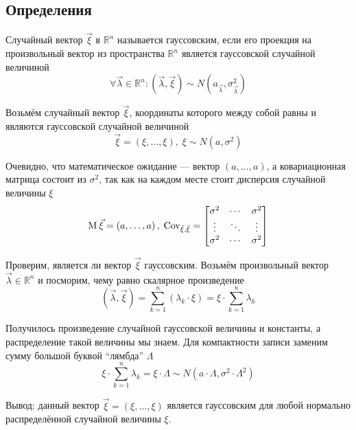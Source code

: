 \subsection{Определения}
\begin{definition}
    \label{def:gaussianVector}
    Случайный вектор $\vec{\xi}$ в $\mathbb{R}^n$ называется гауссовским, если
    его проекция на произвольный вектор из пространства $\mathbb{R}^n$
    является гауссовской случайной величиной
    $$\forall \vec{\lambda} \in \mathbb{R}^n:
        \left( \vec{\lambda}, \vec{\xi} \right)
            \sim N\left( a_{\vec{\lambda}}, \sigma_{\vec{\lambda}}^2 \right)$$
\end{definition}

\begin{example}\label{ex:gaussVectorsIntro}
    Возьмём случайный вектор $\vec{\xi}$, координаты которого между собой равны
    и являются гауссовской случайной величиной
    $$\vec{\xi} = \left( \xi, \dots, \xi \right),\;
        \xi \sim N\left( a, \sigma^2 \right)$$

    Очевидно, что математическое ожидание --- вектор
    $\left( a, \dots, a \right)$, а ковариационная матрица состоит из
    $\sigma^2$, так как на каждом месте стоит дисперсия случайной величины $\xi$
    $$\operatorname{M}_{} \vec{\xi} = \left( a, \dots, a \right),\;
        \operatorname{Cov_{\vec{\xi}, \vec{\xi}}} =
        \begin{bmatrix}
            \sigma^2 & \cdots & \sigma^2 \\
            \vdots & \ddots & \vdots \\
            \sigma^2 & \cdots & \sigma^2
        \end{bmatrix}$$

    Проверим, является ли вектор $\vec{\xi}$ гауссовским.
    Возьмём произвольный вектор $\vec{\lambda} \in \mathbb{R}^n$
    и посморим, чему равно скалярное произведение
    $$\left( \vec{\lambda}, \vec{\xi} \right)
        = \sum_{k=1}^{n} \left( \lambda_k \cdot \xi \right)
        = \xi \cdot \sum_{k=1}^{n} \lambda_k$$

    Получилось произведение случайной гауссовской величины и константы,
    а распределение такой величины мы знаем. Для компактности записи
    заменим сумму большой буквой ``лямбда'' $\Lambda$
    $$\xi \cdot \sum_{k=1}^{n} \lambda_k
        = \xi \cdot \Lambda \sim N\left( a \cdot \Lambda,
            \sigma^2 \cdot \Lambda^2 \right)$$

    Вывод: данный вектор $\vec{\xi}=\left( \xi, \dots, \xi \right)$ является
    гауссовским для любой нормально распределённой случайной величины $\xi$.
\end{example}

